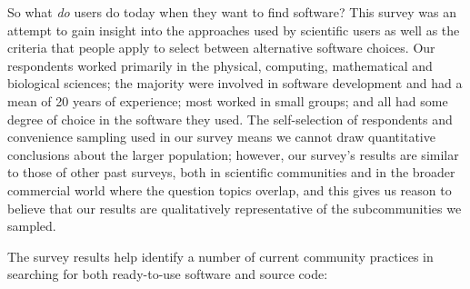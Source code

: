 \documentclass{casicswhitepaper}
\begin{document}
%

So what \emph{do} users do today when they want to find software?  This survey was an attempt to gain insight into the approaches used by scientific users as well as the criteria that people apply to select between alternative software choices.  Our respondents worked primarily in the physical, computing, mathematical and biological sciences; the majority were involved in software development and had a mean of 20 years of experience; most worked in small groups; and all had some degree of choice in the software they used.  The self-selection of respondents and convenience sampling used in our survey means we cannot draw quantitative conclusions about the larger population; however, our survey's results are similar to those of other past surveys, both in scientific communities and in the broader commercial world where the question topics overlap, and this gives us reason to believe that our results are qualitatively representative of the subcommunities we sampled.

The survey results help identify a number of current community practices in searching for both ready-to-use software and source code:
\end{document}
